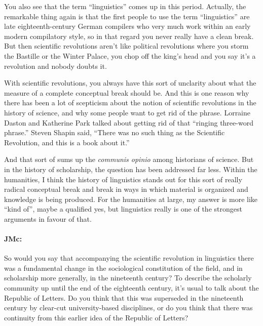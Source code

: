 \documentclass[output=paper]{langscibook}
\begin{document}
You also see that the term “linguistics” comes up in this period. Actually, the remarkable thing again is that the first people to use the term “linguistics” are late eighteenth-century German compilers who very much work within an early modern compilatory style, so in that regard you never really have a clean break. But then scientific revolutions aren’t like political revolutions where you storm the Bastille or the Winter Palace, you chop off the king’s head and you say it’s a revolution and nobody doubts it. 

With scientific revolutions, you always have this sort of unclarity about what the measure of a complete conceptual break should be. And this is one reason why there has been a lot of scepticism about the notion of scientific revolutions in the history of science, and why some people want to get rid of the phrase. Lorraine Daston and Katherine Park talked about getting rid of that “ringing three-word phrase.” Steven Shapin said, “There was no such thing as the Scientific Revolution, and this is a book about it.” 

And that sort of sums up the \textit{communis opinio} among historians of science. But in the history of scholarship, the question has been addressed far less. Within the humanities, I think the history of linguistics stands out for this sort of really radical conceptual break and break in ways in which material is organized and knowledge is being produced. For the humanities at large, my answer is more like “kind of”, maybe a qualified yes, but linguistics really is one of the strongest arguments in favour of that.


\paragraph*{JMc:}  So would you say that accompanying the scientific revolution in linguistics there was a fundamental change in the sociological constitution of the field, and in scholarship more generally, in the nineteenth century? To describe the scholarly community up until the end of the eighteenth century, it’s usual to talk about the Republic of Letters. Do you think that this was superseded in the nineteenth century by clear-cut university-based disciplines, or do you think that there was continuity from this earlier idea of the Republic of Letters?
\end{document}
